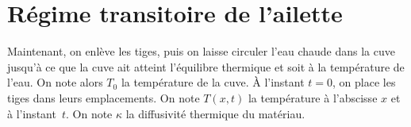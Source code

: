 \section{Régime transitoire de l’ailette\bonus}
%

Maintenant, on enlève les tiges, puis on laisse circuler l’eau chaude dans la cuve jusqu’à ce que la cuve ait atteint l’équilibre thermique et soit à la température de l’eau. On note alors $T_0$ la température de la cuve. À l’instant $t=0$, on place les tiges dans leurs emplacements. On note $T(x,t)$ la température à l’abscisse $x$ et à l’instant~$t$. On note $\kappa$ la diffusivité thermique du matériau.
